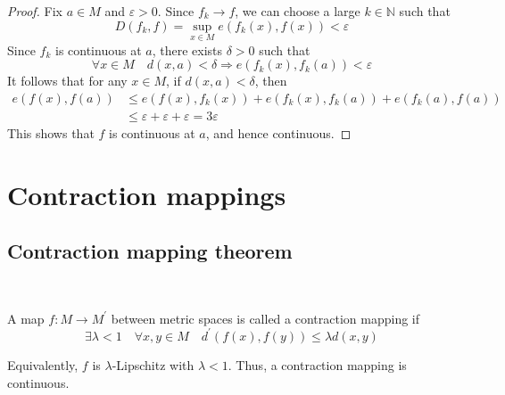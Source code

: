 \documentclass[a4paper,11pt]{article}
\begin{document}
\begin{proof}
    Fix $a \in M$ and $\varepsilon>0$. Since $f_k \rightarrow f$, we can choose a large $k \in \mathbb{N}$ such that
    \[
    D\left(f_k, f\right)=\sup _{x \in M} e\left(f_k(x), f(x)\right)<\varepsilon
    \]
    Since $f_k$ is continuous at $a$, there exists $\delta>0$ such that
    \[
    \forall x \in M \quad d(x, a)<\delta \Longrightarrow e\left(f_k(x), f_k(a)\right)<\varepsilon
    \]
    It follows that for any $x \in M$, if $d(x, a)<\delta$, then
    \[
    \begin{aligned}
    e(f(x), f(a)) & \leqslant e\left(f(x), f_k(x)\right)+e\left(f_k(x), f_k(a)\right)+e\left(f_k(a), f(a)\right) \\
    & \leqslant \varepsilon+\varepsilon+\varepsilon=3 \varepsilon
    \end{aligned}
    \]
    This shows that $f$ is continuous at $a$, and hence continuous.
\end{proof}

\section{Contraction mappings}
\subsection{Contraction mapping theorem}\ \vspace{-1.5em}
\begin{definition}
    A map $f: M \rightarrow M^{\prime}$ between metric spaces is called a contraction mapping if
\[
\exists \lambda<1 \quad \forall x, y \in M \quad d^{\prime}(f(x), f(y)) \leqslant \lambda d(x, y)
\]
\end{definition}
\begin{note}
    Equivalently, $f$ is $\lambda$-Lipschitz with $\lambda<1$. Thus, a contraction mapping is continuous.
\end{note}
\end{document}
